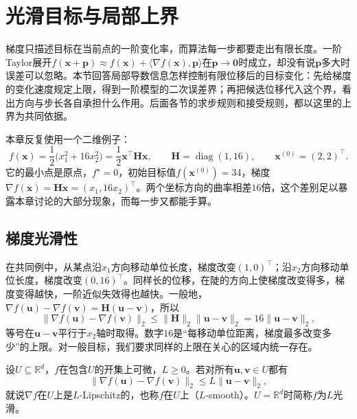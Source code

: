 \section{光滑目标与局部上界}
\label{sec:opt-smooth-local-bounds}

梯度只描述目标在当前点的一阶变化率，而算法每一步都要走出有限长度。一阶Taylor展开$f(\bm x+\bm p)\approx f(\bm x)+\langle\nabla f(\bm x),\bm p\rangle$在$\bm p\to\bm0$时成立，却没有说$\bm p$多大时误差可以忽略。本节回答局部导数信息怎样控制有限位移后的目标变化：先给梯度的变化速度规定上限，得到一阶模型的二次误差界；再把候选位移代入这个界，看出方向与步长各自承担什么作用。后面各节的求步规则和接受规则，都以这里的上界为共同依据。

本章反复使用一个二维例子：
\begin{equation}
\label{eq:opt-smooth-common-quadratic}
  f(\bm x)=\frac12\bigl(x_1^2+16x_2^2\bigr)=\frac12\bm x^\top\bm H\bm x,\qquad
  \bm H=\operatorname{diag}(1,16),\qquad
  \bm x^{(0)}=(2,2)^\top.
\end{equation}
它的最小点是原点，$f^\star=0$，初始目标值$f(\bm x^{(0)})=34$，梯度$\nabla f(\bm x)=\bm H\bm x=(x_1,16x_2)^\top$。两个坐标方向的曲率相差$16$倍，这个差别足以暴露本章讨论的大部分现象，而每一步又都能手算。

\subsection{梯度光滑性}
\label{sec:opt-smooth-lipschitz-gradient}

在共同例中，从某点沿$x_1$方向移动单位长度，梯度改变$(1,0)^\top$；沿$x_2$方向移动单位长度，梯度改变$(0,16)^\top$。同样长的位移，在陡的方向上使梯度改变得多，梯度变得越快，一阶近似失效得也越快。一般地，$\nabla f(\bm u)-\nabla f(\bm v)=\bm H(\bm u-\bm v)$，所以
\[
  \lVert\nabla f(\bm u)-\nabla f(\bm v)\rVert_2\leq\lVert\bm H\rVert_2\lVert\bm u-\bm v\rVert_2=16\lVert\bm u-\bm v\rVert_2,
\]
等号在$\bm u-\bm v$平行于$x_2$轴时取得。数字$16$是“每移动单位距离，梯度最多改变多少”的上限。对一般目标，我们要求同样的上限在关心的区域内统一存在。

\begin{definition}[梯度Lipschitz条件与$L$光滑]
\label{def:opt-smooth-l-smooth}
设$U\subseteq\mathbb R^d$，$f$在包含$U$的开集上可微，$L\geq0$。若对所有$\bm u,\bm v\in U$都有
\[
  \lVert\nabla f(\bm u)-\nabla f(\bm v)\rVert_2\leq L\lVert\bm u-\bm v\rVert_2,
\]
就说$\nabla f$在$U$上是$L$-Lipschitz的，也称$f$在$U$上（$L$-smooth）。$U=\mathbb R^d$时简称$f$为$L$光滑。
\end{definition}

